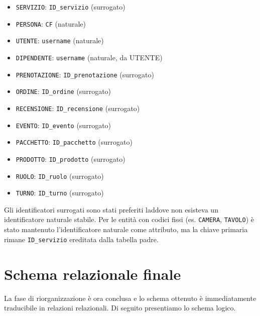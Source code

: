 \documentclass[a4paper,12pt]{report}
\begin{document}
\begin{itemize}
	\item \texttt{SERVIZIO}: \texttt{ID\_servizio} (surrogato)
	\item \texttt{PERSONA}: \texttt{CF} (naturale)
	\item \texttt{UTENTE}: \texttt{username} (naturale)
	\item \texttt{DIPENDENTE}: \texttt{username} (naturale, da UTENTE)
	\item \texttt{PRENOTAZIONE}: \texttt{ID\_prenotazione} (surrogato)
	\item \texttt{ORDINE}: \texttt{ID\_ordine} (surrogato)
	\item \texttt{RECENSIONE}: \texttt{ID\_recensione} (surrogato)
	\item \texttt{EVENTO}: \texttt{ID\_evento} (surrogato)
	\item \texttt{PACCHETTO}: \texttt{ID\_pacchetto} (surrogato)
	\item \texttt{PRODOTTO}: \texttt{ID\_prodotto} (surrogato)
	\item \texttt{RUOLO}: \texttt{ID\_ruolo} (surrogato)
	\item \texttt{TURNO}: \texttt{ID\_turno} (surrogato)
\end{itemize}

Gli identificatori surrogati sono stati preferiti laddove non esisteva un identificatore
naturale stabile. Per le entità con codici fissi (es. \texttt{CAMERA}, \texttt{TAVOLO}) è stato
mantenuto l'identificatore naturale come attributo, ma la chiave primaria rimane \texttt{ID\_servizio}
ereditata dalla tabella padre.

\newpage
\section{Schema relazionale finale}
La fase di riorganizzazione è ora conclusa e lo schema ottenuto è immediatamente traducibile
in relazioni relazionali. Di seguito presentiamo lo schema logico.
\end{document}
